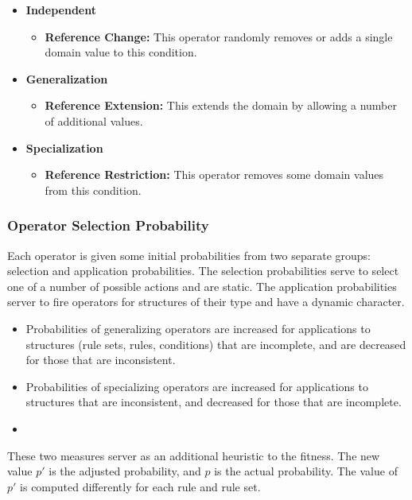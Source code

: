 \documentclass[../main.tex]{subfiles}
\begin{document}
\begin{itemize}
	\item \textbf{Independent}
	\begin{itemize}
		\item \textbf{Reference Change:} This operator randomly removes or adds a single domain value to this
		condition.
	\end{itemize}
	\item \textbf{Generalization}
		\begin{itemize}
		\item \textbf{Reference Extension:} This extends the domain by allowing a number of additional values.
	\end{itemize}
	\item \textbf{Specialization}
	\begin{itemize}
		\item \textbf{Reference Restriction:} This operator removes some domain values from this condition.
	\end{itemize}
\end{itemize}

\subsubsection{Operator Selection Probability}
Each operator is given some initial probabilities from two separate groups: selection and application probabilities.
The selection probabilities serve to select one of a number of possible actions and are static. The application
probabilities server to fire operators for structures of their type and have a dynamic character.

\begin{itemize}
	\item Probabilities of generalizing operators are increased for applications to structures (rule sets, rules,
	conditions) that are incomplete, and are decreased for those that are inconsistent.
	\item Probabilities of specializing operators are increased for applications to structures that are inconsistent,
	and decreased for those that are incomplete.
	\item
\end{itemize}

These two measures server as an additional heuristic to the fitness. The new value $p'$ is the adjusted probability,
and $p$ is the actual probability. The value of $p'$ is computed differently for each rule and rule set.
\end{document}
